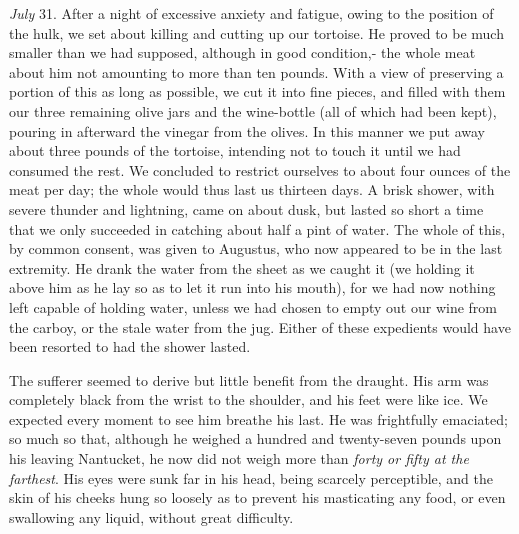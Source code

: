 \emph{July} 31. After a night of excessive anxiety and fatigue, owing to the
position of the hulk, we set about killing and cutting up our tortoise. He
proved to be much smaller than we had supposed, although in good condition,- the
whole meat about him not amounting to more than ten pounds. With a view of
preserving a portion of this as long as possible, we cut it into fine pieces,
and filled with them our three remaining olive jars and the wine-bottle (all of
which had been kept), pouring in afterward the vinegar from the olives. In this
manner we put away about three pounds of the tortoise, intending not to touch it
until we had consumed the rest. We concluded to restrict ourselves to about four
ounces of the meat per day; the whole would thus last us thirteen days. A brisk
shower, with severe thunder and lightning, came on about dusk, but lasted so
short a time that we only succeeded in catching about half a pint of water. The
whole of this, by common consent, was given to Augustus, who now appeared to be
in the last extremity. He drank the water from the sheet as we caught it (we
holding it above him as he lay so as to let it run into his mouth), for we had
now nothing left capable of holding water, unless we had chosen to empty out our
wine from the carboy, or the stale water from the jug. Either of these
expedients would have been resorted to had the shower lasted. 

The sufferer seemed to derive but little benefit from the draught. His arm
was completely black from the wrist to the shoulder, and his feet were like ice.
We expected every moment to see him breathe his last. He was frightfully
emaciated; so much so that, although he weighed a hundred and twenty-seven
pounds upon his leaving Nantucket, he now did not weigh more than \emph{forty or
fifty at the farthest}. His eyes were sunk far in his head, being scarcely
perceptible, and the skin of his cheeks hung so loosely as to prevent his
masticating any food, or even swallowing any liquid, without great
difficulty. 


